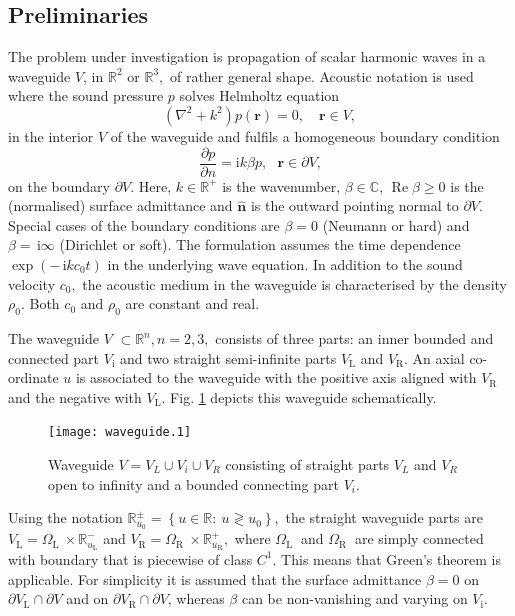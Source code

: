 \documentclass{kluwer}
\renewcommand{\Re}{\operatorname{Re}}
\renewcommand{\i}{\,\mathrm{i}}
\begin{document}
\begin{article}
\section{Preliminaries}
\label{sec:prel}

The problem under investigation is propagation of scalar harmonic
waves in a waveguide $V$, in $\mathbb{R}^{2}$ or $\mathbb{R}^{3},$ of
rather general shape. Acoustic notation is used where the sound
pressure $p$ solves Helmholtz equation%
\begin{equation}
  (\nabla^{2}+k^{2})p(\bm{r})=0,\quad\bm{r}\in V, \label{101}%
\end{equation}
in the interior $V$ of the waveguide and fulfils a homogeneous
boundary condition%
\begin{equation}
  \dfrac{\partial p}{\partial n}=\text{i}k\beta p,
  \text{ }\bm{r}\in\partial V\text{,} \label{102}%
\end{equation}
on the boundary $\partial V$. Here, $k\in\mathbb{R}^{+}$ is the
wavenumber, $\beta\in\mathbb{C}$, $\Re\beta\geq0$ is the (normalised)
surface admittance and $\widehat{\bm{n}}$ is the outward pointing
normal to $\partial V$. Special cases of the boundary conditions are
$\beta=0$ (Neumann or hard) and $\beta=\i\infty$ (Dirichlet or
soft). The formulation assumes the time dependence $\exp(-\i kc_{0}t)$
in the underlying wave equation. In addition to the sound velocity
$c_{0},$ the acoustic medium in the waveguide is characterised by the
density $\rho_{0}.$ Both $c_{0}$ and $\rho_{0}$ are constant and real.

The waveguide $V$ $\subset\mathbb{R}^{n},n=2,3,$ consists of three
parts: an inner bounded and connected part $V_{\text{i}}$ and two
straight semi-infinite parts $V_{\text{L}}$ and $V_{\text{R}}$. An
axial co-ordinate $u$ is associated to the waveguide with the positive
axis aligned with $V_{\text{R}}$ and the negative with $V_{\text{L}}.$
Fig.  \ref{fig:wg1} depicts this waveguide schematically.%
\begin{figure}[htb]
  \centering
  \texttt{[image: waveguide.1]}
  \caption{Waveguide $V=V_L\cup V_i\cup V_R$ consisting of straight
    parts $V_L$ and $V_R$ open to infinity and a bounded connecting
    part $V_i$.}
  \label{fig:wg1}
\end{figure}
Using the notation $\mathbb{R}_{u_0}^{\pm}=\left\{ u\in\mathbb{R}:\
  u\gtrless u_{0}\right\} ,$ the straight waveguide parts are
$V_{\text{L}%
}=\Omega_{\text{L }}\times\mathbb{R}_{u_{\text{L}}}^{-}$ and
$V_{\text{R}%
}=\Omega_{\text{R }}\times\mathbb{R}_{u_{\text{R}}}^{+},$ where
$\Omega _{\text{L }}$ and $\Omega_{\text{R }}$ are simply connected
with boundary that is piecewise of class $C^{1}.$ This means that
Green's theorem is applicable.  For simplicity it is assumed that the
surface admittance $\beta=0$ on $\partial V_{\text{L}}\cap\partial V$
and on $\partial V_{\text{R}}\cap\partial V$, whereas $\beta$ can be
non-vanishing and varying on $V_{\text{i}}.$


\end{article}
\end{document}
